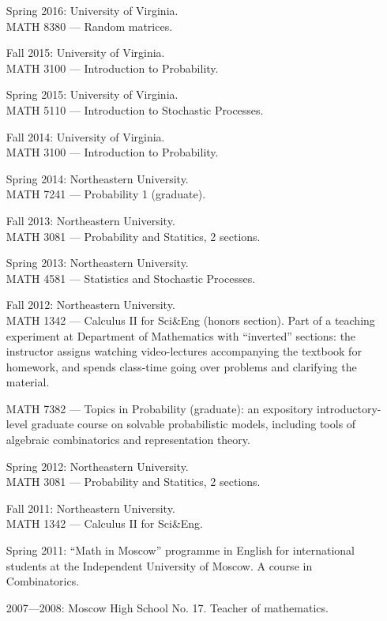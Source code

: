 \documentclass[letterpaper,11pt]{article}
\begin{document}
\begin{itemize}
	\item
	      [Spring 2016:]
	      University of Virginia. \\ MATH 8380 --- Random matrices.

	\item
	      [Fall 2015:]
	      University of Virginia. \\ MATH 3100 --- Introduction to
	      Probability.

	\item
	      [Spring 2015:]
	      University of Virginia. \\ MATH 5110 --- Introduction to
	      Stochastic Processes.

	\item
	      [Fall 2014:]
	      University of Virginia. \\ MATH 3100 --- Introduction to
	      Probability.

	\item
	      [Spring 2014:]
	      Northeastern University. \\ MATH 7241 --- Probability 1
	      (graduate).

	\item
	      [Fall 2013:]
	      Northeastern University. \\ MATH 3081 --- Probability and
	      Statitics, 2 sections.
	\item
	      [Spring 2013:]
	      Northeastern University. \\ MATH 4581 --- Statistics and
	      Stochastic Processes.
	\item
	      [Fall 2012:]
	      Northeastern University. \\ MATH 1342 --- Calculus II for
	      Sci\&Eng (honors section). Part of a teaching experiment at Department of
	      Mathematics with ``inverted'' sections: the instructor assigns watching
	      video-lectures accompanying the textbook for homework, and spends class-time
	      going over problems and clarifying the material.

	      MATH 7382 --- Topics in Probability (graduate): an expository
	      introductory-level graduate course on solvable probabilistic models, including
	      tools of algebraic combinatorics and representation theory.

	\item
	      [Spring 2012:]
	      Northeastern University. \\ MATH 3081 --- Probability and
	      Statitics, 2 sections.
	\item
	      [Fall 2011:]
	      Northeastern University.\\ MATH 1342 --- Calculus II for
	      Sci\&Eng.
	\item
	      [Spring 2011:]
	      ``Math in Moscow'' programme in English for international
	      students at the Independent University of Moscow. A course in
	      Combinatorics.

	\item
	      [2007---2008:]
	      Moscow High School No. 17. Teacher of mathematics.
\end{itemize}
\end{document}
